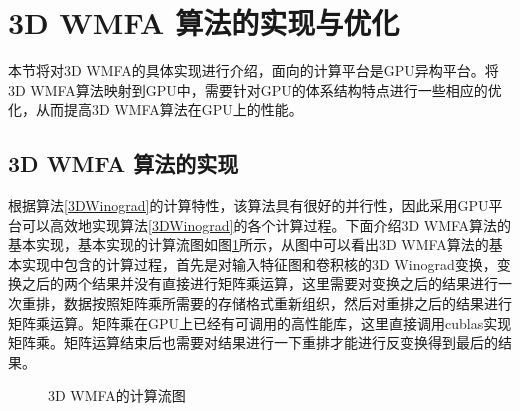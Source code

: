\section{3D WMFA 算法的实现与优化}
本节将对3D WMFA的具体实现进行介绍，面向的计算平台是GPU异构平台。将3D WMFA算法映射到GPU中，需要针对GPU的体系结构特点进行一些相应的优化，从而提高3D WMFA算法在GPU上的性能。

\subsection{3D WMFA 算法的实现}
\label{baselineIm}
根据算法\ref{3DWinograd}的计算特性，该算法具有很好的并行性，因此采用GPU平台可以高效地实现算法\ref{3DWinograd}的各个计算过程。下面介绍3D WMFA算法的基本实现，基本实现的计算流图如图\ref{computeflow}所示，从图中可以看出3D WMFA算法的基本实现中包含的计算过程，首先是对输入特征图和卷积核的3D Winograd变换，变换之后的两个结果并没有直接进行矩阵乘运算，这里需要对变换之后的结果进行一次重排，数据按照矩阵乘所需要的存储格式重新组织，然后对重排之后的结果进行矩阵乘运算。矩阵乘在GPU上已经有可调用的高性能库，这里直接调用cublas实现矩阵乘。矩阵运算结束后也需要对结果进行一下重排才能进行反变换得到最后的结果。
\begin{figure}[tbh]%
\centering
{}
\caption{3D WMFA的计算流图}
\label{computeflow}
\end{figure}


